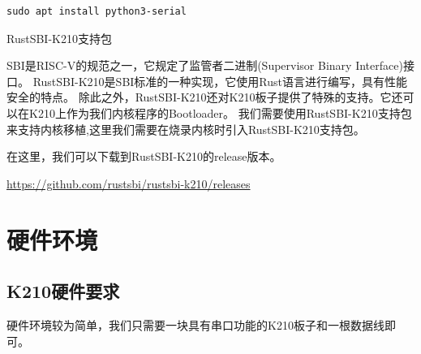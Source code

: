 \begin{lstlisting}[caption={安装miniterm}, label={lst:install_miniterm}]
    sudo apt install python3-serial
\end{lstlisting}

RustSBI-K210支持包

SBI是RISC-V的规范之一，它规定了监管者二进制(Supervisor Binary Interface)接口。
RustSBI-K210是SBI标准的一种实现，它使用Rust语言进行编写，具有性能安全的特点。
除此之外，RustSBI-K210还对K210板子提供了特殊的支持。它还可以在K210上作为我们内核程序的Bootloader\cite{马学文2005嵌入式系统中}。
我们需要使用RustSBI-K210支持包来支持内核移植,这里我们需要在烧录内核时引入RustSBI-K210支持包。

在这里，我们可以下载到RustSBI-K210的release版本。

\href{https://github.com/rustsbi/rustsbi-k210/releases}{https://github.com/rustsbi/rustsbi-k210/releases}
    
\section{硬件环境}

\subsection{K210硬件要求}

硬件环境较为简单，我们只需要一块具有串口功能的K210板子和一根数据线即可。

